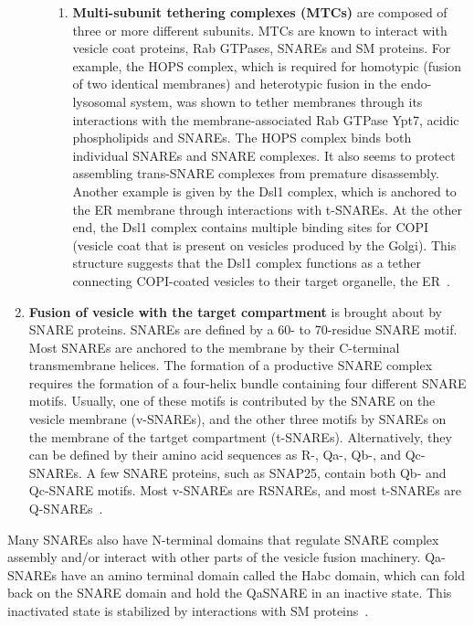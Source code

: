 \begin{enumerate}
\begin{enumerate}[label=(\roman*)]
\begin{enumerate}[label=(\alph*)]
			\item \textbf{Multi-subunit tethering complexes (MTCs)} are composed of three or more different
			subunits.
			MTCs are known to interact with vesicle coat proteins, Rab GTPases, SNAREs and SM proteins.
			For example, the HOPS complex, which is required for homotypic (fusion of two identical
			membranes) and heterotypic fusion in the endo-lysosomal system, was shown to tether membranes
			through its interactions with the membrane-associated Rab GTPase Ypt7, acidic phospholipids and
			SNAREs. 
			The HOPS complex binds both individual SNAREs and SNARE complexes. It also
			seems to protect assembling trans-SNARE complexes from premature disassembly. 
			Another example is given by the Dsl1 complex, which is anchored to the ER membrane through interactions
			with t-SNAREs. 
			At the other end, the Dsl1 complex contains multiple binding sites for COPI
			(vesicle coat that is present on vesicles produced by the Golgi). 
			This structure suggests that the Dsl1
			complex functions as a tether connecting COPI-coated vesicles to their target organelle, the ER~\cite{baker2016chaperoning}.
			
		\end{enumerate}
		
	\end{enumerate}
	
	\item \textbf{Fusion of vesicle with the target compartment} is brought about by SNARE proteins. 
	SNAREs
	are defined by a 60- to 70-residue SNARE motif. Most SNAREs are anchored to the membrane by
	their C-terminal transmembrane helices. 
	The formation of a productive SNARE complex requires
	the formation of a four-helix bundle containing four different SNARE motifs. Usually, one of these
	motifs is contributed by the SNARE on the vesicle membrane (v-SNAREs), and the other three
	motifs by SNAREs on the membrane of the tartget compartment (t-SNAREs). 
	Alternatively, they
	can be defined by their amino acid sequences as R-, Qa-, Qb-, and Qc-SNAREs. A few SNARE
	proteins, such as SNAP25, contain both Qb- and Qc-SNARE motifs.
	Most v-SNAREs are RSNAREs, and most t-SNAREs are Q-SNAREs~\cite{yoon2018snare}.
	
	
\end{enumerate}

Many SNAREs also have N-terminal domains that regulate SNARE complex assembly and/or
interact with other parts of the vesicle fusion machinery. 
%
Qa-SNAREs have an amino terminal
domain called the Habc domain, which can fold back on the SNARE domain and hold the QaSNARE
in an inactive state. 
%
This inactivated state is stabilized by interactions with SM proteins~\cite{yoon2018snare}.	      

